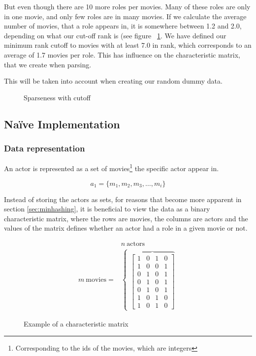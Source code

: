 \documentclass[a4paper,11pt]{article}
\begin{document}
But even though there are 10 more roles per movies. Many of these roles are only in one movie, and only few roles are in many movies. If we calculate the average number of movies, that a role appears in, it is somewhere between 1.2 and 2.0, depending on what our cut-off rank is (see figure ~\ref{fig:sparsenesscutoff}. We have defined our minimum rank cutoff to movies with at least 7.0 in rank, which corresponds to an average of 1.7 movies per role. This has influence on the characteristic matrix, that we create when parsing.

This will be taken into account when creating our random dummy data.

\begin{figure}[!htbp]
    \begin{center}
        
        \caption{Sparseness with cutoff}
        \label{fig:sparsenesscutoff}
    \end{center}
\end{figure}

\subsection{Naïve Implementation}

\subsubsection{Data representation}
An actor is represented as a set of movies\footnote{Corresponding to the ids of the movies, which are integers} the specific actor appear in.

\begin{equation}
a_1 = \{m_1, m_2, m_3, \ldots , m_i\}
\end{equation}

Instead of storing the actors as sets, for reasons that become more apparent in section \ref{sec:minhashing}, it is beneficial to view the data as a binary characteristic matrix, where the rows are movies, the columns are actors and the values of the matrix defines whether an actor had a role in a given movie or not.\\ 

\begin{figure}[!htbp]
\begin{eqnarray*}
 & n \ \text{actors} \\
 m \ \text{movies} = & 
\begin{cases}
    \overbrace{
    \begin{bmatrix}
        1 & 0 & 1 & 0 \\
        1 & 0 & 0 & 1 \\
        0 & 1 & 0 & 1 \\
        0 & 1 & 0 & 1 \\
        0 & 1 & 0 & 1 \\
        1 & 0 & 1 & 0 \\
        1 & 0 & 1 & 0
    \end{bmatrix} 
    }
\end{cases}
\end{eqnarray*}
\caption{Example of a characteristic matrix}
\label{fig:char_matrix}
\end{figure}
\end{document}
